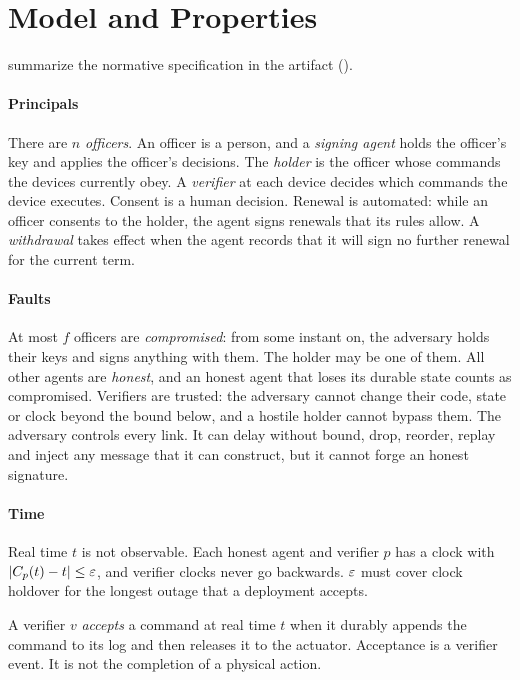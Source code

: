 \section{Model and Properties}
\label{sec:model}

 summarize the normative specification in the artifact
().

\paragraph{Principals}
There are $n$ \emph{officers}. An officer is a person, and a \emph{signing agent} holds
the officer's key and applies the officer's decisions. The \emph{holder} is the officer
whose commands the devices currently obey. A \emph{verifier} at each device decides which
commands the device executes. Consent is a human decision. Renewal is automated: while an
officer consents to the holder, the agent signs renewals that its rules allow. A
\emph{withdrawal} takes effect when the agent records that it will sign no further renewal
for the current term.

\paragraph{Faults}
At most $f$ officers are \emph{compromised}: from some instant on, the adversary holds
their keys and signs anything with them. The holder may be one of them. All other agents
are \emph{honest}, and an honest agent that loses its durable state counts as
compromised. Verifiers are trusted: the adversary cannot change their code, state or
clock beyond the bound below, and a hostile holder cannot bypass them. The adversary
controls every link. It can delay without bound, drop, reorder, replay and inject any
message that it can construct, but it cannot forge an honest signature.

\paragraph{Time}
Real time $t$ is not observable. Each honest agent and verifier $p$ has a clock with
$|C_p(t) - t| \le \varepsilon$, and verifier clocks never go backwards. $\varepsilon$ must cover clock
holdover for the longest outage that a deployment accepts.

\begin{dfn}[Acceptance]
A verifier $v$ \emph{accepts} a command at real time $t$ when it durably appends the
command to its log and then releases it to the actuator. Acceptance is a verifier event.
It is not the completion of a physical action.
\end{dfn}

